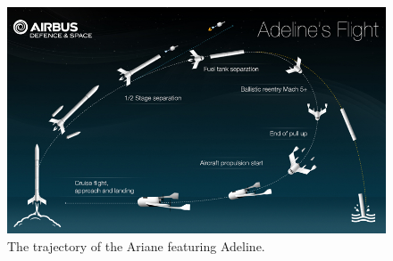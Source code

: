    
    
    
    
    
    
    \begin{figure}[ht]
    	\centering
    	\includegraphics[width=0.7\linewidth]{figures/2_literature-review/visuel_adeline1}
    	\caption{The trajectory of the Ariane featuring Adeline\cite{Adelineb}.}
    	\label{fig:visuel_adeline1}
    \end{figure}
    
